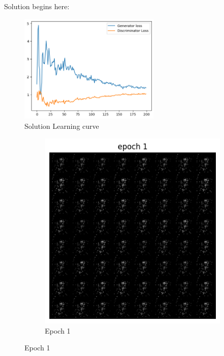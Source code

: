 \documentclass[a4paper]{article}
\theoremstyle{definition}
\newenvironment{soln}{
	\leavevmode\color{blue}\ignorespaces
}{}
\begin{document}
\begin{enumerate} [label=(\alph*)]
		
		\begin{soln}
                Solution begins here:
                \begin{figure}[H]
    			\centering
    			\includegraphics[width=0.6\textwidth]{Images/Q1/Q1a_train.png}
    			\caption{Solution Learning curve}
    			\label{fig:gan_q1a_loss}
    		\end{figure}
                \begin{figure}[H]
    			\centering
    			\begin{subfigure}[b]{0.3\textwidth}
    				\centering
    				\includegraphics[width=\textwidth]{Images/Q1/Q1a_1.png}
    				\caption{Epoch 1}
    			\end{subfigure}

\end{figure}
\end{soln}
\end{enumerate}
\end{document}
